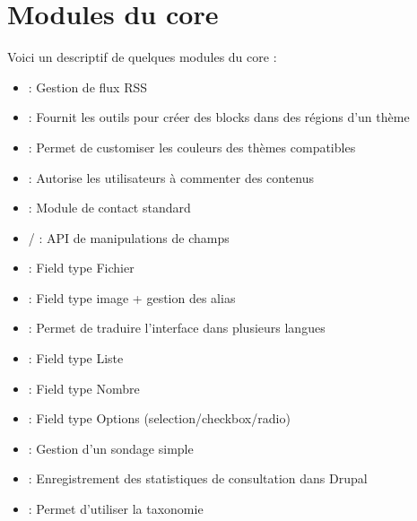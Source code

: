 \documentclass[a4paper,11pt,french]{rtdsphinxmanual}
\begin{document}
\section{Modules du core}
\label{modules:modules-du-core}
Voici un descriptif de quelques modules du core :
\begin{itemize}
\item {} 
 : Gestion de flux RSS

\item {} 
 : Fournit les outils pour créer des blocks dans des régions d'un thème

\item {} 
 : Permet de customiser les couleurs des thèmes compatibles

\item {} 
 : Autorise les utilisateurs à commenter des contenus

\item {} 
 : Module de contact standard

\item {} 
 /  : API de manipulations de champs

\item {} 
 : Field type Fichier

\item {} 
 : Field type image + gestion des alias

\item {} 
 : Permet de traduire l'interface dans plusieurs langues

\item {} 
 : Field type Liste

\item {} 
 : Field type Nombre

\item {} 
 : Field type Options (selection/checkbox/radio)

\item {} 
 : Gestion d'un sondage simple

\item {} 
 : Enregistrement des statistiques de consultation dans Drupal

\item {} 
 : Permet d'utiliser la taxonomie

\end{itemize}
\end{document}

